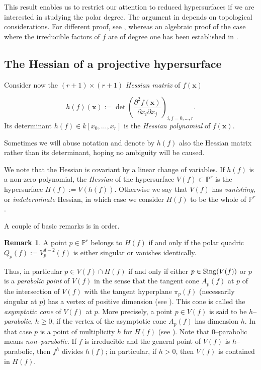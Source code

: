 \documentclass[11pt]{article}   %
\theoremstyle{definition}
\newtheorem{Remark}[Theorem]{Remark}
\numberwithin{Theorem}{section} \numberwithin{equation}{section}
\newcommand{\Proj}{{\mathbb P}}
\newcommand{\p}{{\mathbb P}}
\begin{document}
{This result enables us to restrict our attention to reduced
hypersurfaces if we are interested in studying the polar degree. The
argument in \cite{DP} depends on topological considerations.
For different proof, see \cite {FP} , whereas an
algebraic  proof of the case where the irreducible factors of $f$
are of degree one has been established in \cite{Bruno}.


\subsection{The Hessian of a projective hypersurface}\label{hess_of_hyp}

Consider now the $(r+1)\times(r+1)$ {\it Hessian matrix\/} of
$f(\mathbf{x})$

$$h(f)(\mathbf{x}):=\det\left(\frac{\partial^2 f(\mathbf{x})}{\partial x_i\partial
x_j}\right)_{i,j=0,...,r}.$$ Its determinant $h(f)\in
k[x_0,\ldots,x_r]$ is the {\it Hessian polynomial\/} of
$f(\mathbf{x})$.


Sometimes we will abuse notation and denote by $h(f)$ also the
Hessian matrix rather than its determinant, hoping no ambiguity will
 be caused.

We note that the Hessian is covariant by a linear change of
variables. If $h(f)$ is a non-zero polynomial,  the {\it Hessian\/}
of the hypersurface $V(f)\subset \p^r$ is the hypersurface
$H(f):=V(h(f))$. Otherwise we say that $V(f)$ has {\it vanishing\/},
or {\it indeterminate\/} Hessian, in which case we consider $H(f)$
to be the whole of $\Proj^ r$.


A couple of basic remarks is in order.

\begin{Remark}\label {hesspol} A point $p\in \p^r$ belongs to $H(f)$ if and only if
the polar quadric $Q_p(f):=V_p^ {d-2}(f)$ is either singular or
vanishes identically.

Thus, in particular $p\in V(f)\cap H(f)$ if and only if either $p\in
{\rm Sing}(V(f))$ or $p$ is a {\it parabolic point\/} of $V(f)$ in
the sense that the tangent cone $A_p(f)$ at $p$ of the intersection
of $V(f)$ with the tangent hyperplane $\pi_p(f)$ (necessarily
singular at $p$) has a vertex of positive dimension (see \cite[p.
71]{Segrepr}). This cone is called the {\it asymptotic cone\/} of
$V(f)$ at $p$. More precisely, a point $p\in V(f)$ is said to be
$h$--{\it parabolic}, $h\geq 0$, if the vertex of the asymptotic
cone $A_p(f)$ has dimension $h$. In that case $p$ is a point of
multiplicity $h$ for $H(f)$ (see \cite{Segre}). Note that
$0$--parabolic means \emph {non--parabolic}. If $f$ is irreducible
and the general point of $V(f)$ is $h$--parabolic, then $f^ {h}$
divides $h(f)$; in particular, if $h>0$, then $V(f)$ is contained in
$H(f)$.



\end{Remark}}
\end{document}
